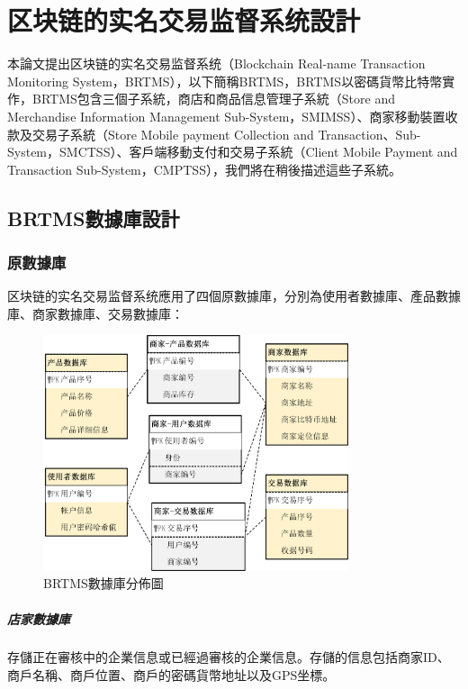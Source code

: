
\chapter{区块链的实名交易监督系统設計}
本論文提出区块链的实名交易监督系统（Blockchain Real-name Transaction Monitoring System，BRTMS），以下簡稱BRTMS，BRTMS以密碼貨幣比特幣實作，BRTMS包含三個子系統，商店和商品信息管理子系統（Store and Merchandise Information Management Sub-System，SMIMSS）、商家移動裝置收款及交易子系統（Store Mobile payment Collection and Transaction、Sub-System，SMCTSS）、客戶端移動支付和交易子系統（Client Mobile Payment and Transaction Sub-System，CMPTSS），我們將在稍後描述這些子系統。

	\section{BRTMS數據庫設計}

		\subsection{原數據庫}
		区块链的实名交易监督系统應用了四個原數據庫，分別為使用者數據庫、產品數據庫、商家數據庫、交易數據庫：

		\begin{figure}[h]
			\centering
			\includegraphics[width = 0.8\textwidth]{db.png}
			\caption{BRTMS數據庫分佈圖}\label{db}
		\end{figure}

			\paragraph{店家數據庫}存儲正在審核中的企業信息或已經過審核的企業信息。存儲的信息包括商家ID、商戶名稱、商戶位置、商戶的密碼貨幣地址以及GPS坐標。
